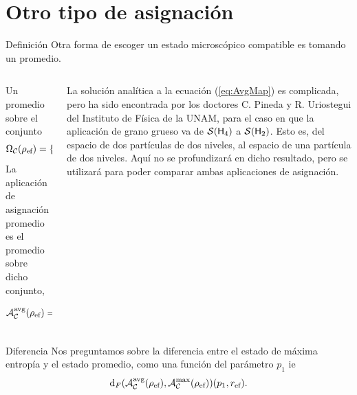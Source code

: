 \section{Otro tipo de asignación}

\begin{frame}{Definición}
    Otra forma de escoger un estado microscópico compatible es tomando un promedio.
    \begin{columns}
        \begin{column}{0.5\textwidth}
            Un promedio sobre el conjunto
            \begin{equation}
                \Omega_{\mcC}(\rho_{\ef}) = \{\ket{\psi}\in\hilbert_{m}:\, \mcC(\dyad{\psi}) = \rho_{\ef}  \}.\nonumber
            \end{equation}
            La aplicación de asignación promedio es el promedio sobre dicho conjunto, \ie 
            \begin{equation}
            \mcA_{\mcC}^{\avg}(\rho_{\ef}) =\int d \mu\,\, \delta(\mcC(\dyad{\psi})-\rho_{\ef})\,\dyad{\psi}.
            \end{equation}
        \end{column}
        \begin{column}{0.5\textwidth}
            La solución analítica a la ecuación (\ref{eq:AvgMap}) es complicada, pero ha sido encontrada por los doctores C. Pineda y R. Uriostegui del Instituto de Física de la UNAM, para el caso en que la aplicación de grano grueso va de $\mathcal{S}({\sf H}_{4})$ a $\mathcal{S}({\sf H}_{2})$. Esto es, del espacio de dos partículas de dos niveles, al espacio de una partícula de dos niveles. Aquí no se profundizará en dicho resultado, pero se utilizará para poder comparar ambas aplicaciones de asignación.
        \end{column}
    \end{columns}
\end{frame}

\begin{frame}{Diferencia}
    Nos preguntamos sobre la diferencia entre el estado de máxima entropía y el estado promedio, como una función del parámetro $p_{1}$ ie{} 
    \begin{equation}
        \text{d}_{F}\qty(\mathcal{A}_{\mathcal{C}}^{\text{avg}}(\rho_{\text{ef}}),\mathcal{A}_{\mathcal{C}}^{\max}(\rho_{\text{ef}}))(p_{1},r_{\text{ef}}).\nonumber
    \end{equation}
\end{frame}

